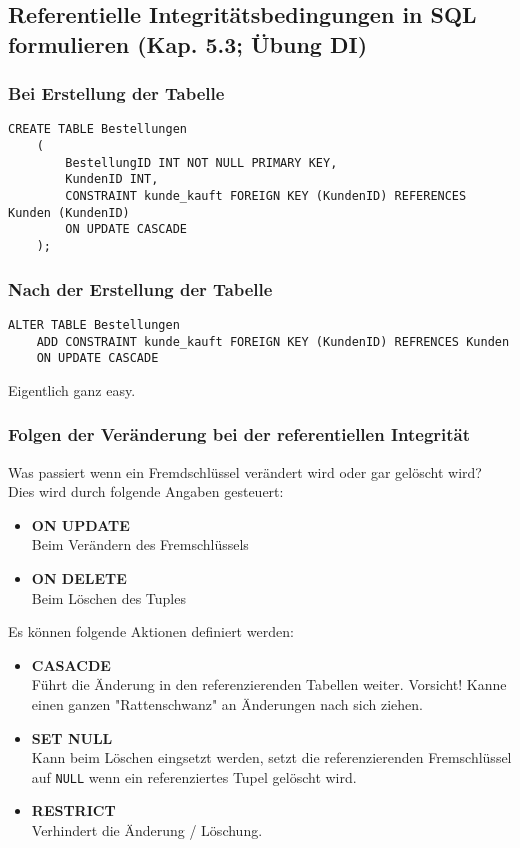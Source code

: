 \subsection{Referentielle Integritätsbedingungen in SQL formulieren (Kap. 5.3; Übung DI)}

\subsubsection{Bei Erstellung der Tabelle}
\begin{lstlisting}[caption={Referentielle Integrität bei Erstellung}]
    CREATE TABLE Bestellungen
    (
        BestellungID INT NOT NULL PRIMARY KEY,
        KundenID INT,
        CONSTRAINT kunde_kauft FOREIGN KEY (KundenID) REFERENCES Kunden (KundenID)
        ON UPDATE CASCADE
    );
\end{lstlisting}

\subsubsection{Nach der Erstellung der Tabelle}
\begin{lstlisting}[caption={Referentielle Integrität Update}]
    ALTER TABLE Bestellungen
    ADD CONSTRAINT kunde_kauft FOREIGN KEY (KundenID) REFRENCES Kunden
    ON UPDATE CASCADE
\end{lstlisting}

Eigentlich ganz easy.

\subsubsection{Folgen der Veränderung bei der referentiellen Integrität}
Was passiert wenn ein Fremdschlüssel verändert wird oder gar gelöscht wird? Dies wird durch folgende Angaben gesteuert:

\begin{itemize}
  \item \textbf{ON UPDATE} \\
  Beim Verändern des Fremschlüssels
  \item \textbf{ON DELETE} \\
  Beim Löschen des Tuples
\end{itemize}
Es können folgende Aktionen definiert werden:
\begin{itemize}
  \item \textbf{CASACDE} \\
  Führt die Änderung in den referenzierenden Tabellen weiter. Vorsicht! Kanne einen ganzen "Rattenschwanz" an Änderungen nach sich ziehen.
  \item \textbf{SET NULL} \\
  Kann beim Löschen eingsetzt werden, setzt die referenzierenden Fremschlüssel auf \texttt{NULL} wenn ein referenziertes Tupel gelöscht wird.
  \item \textbf{RESTRICT} \\
  Verhindert die Änderung / Löschung.
\end{itemize}


